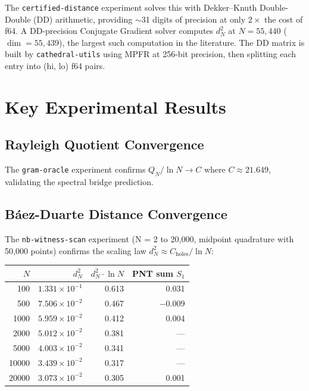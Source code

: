 \documentclass[11pt,a4paper]{article}
\begin{document}
The \texttt{certified-distance} experiment solves this with
Dekker--Knuth Double-Double (DD) arithmetic, providing $\sim$31 digits
of precision at only $2\times$ the cost of f64. A DD-precision
Conjugate Gradient solver computes $d^2_N$ at $N = 55{,}440$
($\dim = 55{,}439$), the largest such computation in the literature.
The DD matrix is built by \texttt{cathedral-utils} using MPFR at
256-bit precision, then splitting each entry into (hi, lo) f64 pairs.

\section{Key Experimental Results}

\subsection{Rayleigh Quotient Convergence}

The \texttt{gram-oracle} experiment confirms $Q_N/\ln N \to C$
where $C \approx 21.649$, validating the spectral bridge prediction.

\subsection{B\'aez-Duarte Distance Convergence}

The \texttt{nb-witness-scan} experiment (N = 2 to 20{,}000, midpoint
quadrature with 50{,}000 points) confirms the scaling law
$d_N^2 \approx C_{\mathrm{holes}}/\ln N$:

\begin{center}
\begin{tabular}{@{}rrrr@{}}
\toprule
$N$ & $d_N^2$ & $d_N^2 \cdot \ln N$ & PNT sum $S_1$ \\
\midrule
100 & $1.331 \times 10^{-1}$ & 0.613 & 0.031 \\
500 & $7.506 \times 10^{-2}$ & 0.467 & $-0.009$ \\
1000 & $5.959 \times 10^{-2}$ & 0.412 & 0.004 \\
2000 & $5.012 \times 10^{-2}$ & 0.381 & --- \\
5000 & $4.003 \times 10^{-2}$ & 0.341 & --- \\
10000 & $3.439 \times 10^{-2}$ & 0.317 & --- \\
20000 & $3.073 \times 10^{-2}$ & 0.305 & 0.001 \\
\bottomrule
\end{tabular}
\end{center}
\end{document}
